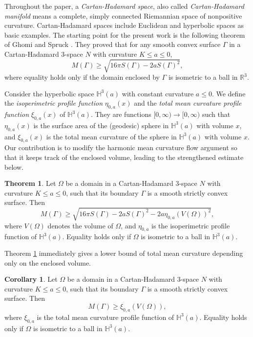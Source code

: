 \documentclass[11pt]{amsart}
\theoremstyle{definition}
\newcommand{\RR}{\mathbb{R}}
\newcommand{\HH}{\mathbb{H}}
\newtheorem{thm}[prop]{Theorem}
\newtheorem{cor}[prop]{Corollary}
\theoremstyle{remark}
\numberwithin{equation}{section}
\begin{document}
	Throughout the paper, a \emph{Cartan-Hadamard space}, also called \emph{Cartan-Hadamard manifold} means a complete, simply connected Riemannian space of nonpositive curvature. Cartan-Hadamard spaces include Euclidean and hyperbolic spaces as basic examples. The starting point for the present work is the following theorem of Ghomi and Spruck \cite{ghomi-spruck2023}. They proved that for any smooth convex surface $\Gamma$ in a Cartan-Hadamard 3-space $N$ with curvature $K\leq a\leq 0$,
	\begin{equation}\label{eq:minkowski2}
		M(\Gamma)\geq \sqrt{16\pi S(\Gamma)- 2 a S(\Gamma)^2},
	\end{equation}
	where equality holds only if the domain enclosed by $\Gamma$ is isometric to a ball in $\RR^3$.
	
	Consider the hyperbolic space $\HH^3(a)$ with constant curvature $a \leq 0$. We define the \emph{isoperimetric profile function} $\eta_{0,a}(x)$ and the \emph{total mean curvature profile function} $\xi_{0,a}(x)$ of $\HH^3(a)$. They are functions $[0, \infty) \to [0,\infty)$ such that $\eta_{0,a}(x)$ is the surface area of the (geodesic) sphere in $\HH^3(a)$ with volume $x$, and $\xi_{0,a}(x)$ is the total mean curvature of the sphere in $\HH^3(a)$ with volume $x$. Our contribution is to modify the harmonic mean curvature flow argument so that it keeps track of the enclosed volume, leading to the strengthened estimate below.
	
	\begin{thm}\label{thm:minkowski1}
		Let $\Omega$ be a domain in a Cartan-Hadamard 3-space $N$ with curvature $K\leq a\leq 0$, such that its boundary $\Gamma$ is a smooth strictly convex surface. Then 
		\begin{equation}
			\label{eq:minkowski1}
			M(\Gamma)\geq \sqrt{16\pi S(\Gamma)- 2 a S(\Gamma)^2 - 2 a \eta_{0,a}(V(\Omega))^2},
		\end{equation}
		where $V(\Omega)$ denotes the volume of $\Omega$, and $\eta_{0,a}$ is the isoperimetric profile function of $\HH^3(a)$.
		Equality holds only if $\Omega$ is isometric to a ball in $\HH^3(a)$.
	\end{thm}
	
	Theorem \ref{thm:minkowski1} immediately gives a lower bound of total mean curvature depending only on the enclosed volume.
	
	\begin{cor}\label{cor:minkowski1}
		Let $\Omega$ be a domain in a Cartan-Hadamard 3-space $N$ with curvature $K\leq a\leq 0$, such that its boundary $\Gamma$ is a smooth strictly convex surface. Then 
		\begin{equation}
			\label{eq:cor-minkowski1}
			M(\Gamma)\geq \xi_{0,a}(V(\Omega)),
		\end{equation}
		where $\xi_{0,a}$ is the total mean curvature profile function of  $\HH^3(a)$.
		Equality holds only if $\Omega$ is isometric to a ball in $\HH^3(a)$.
	\end{cor}
	
\end{document}
